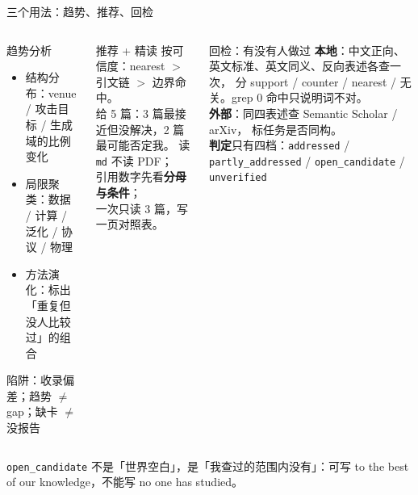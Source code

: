 \begin{frame}{三个用法：趋势、推荐、回检}
  \vspace{-3em}
  \begin{columns}[T]
    \scriptsize
    \begin{block}{趋势分析}
      \begin{itemize}
        \item 结构分布：venue / 攻击目标 / 生成域的比例变化
        \item 局限聚类：数据 / 计算 / 泛化 / 协议 / 物理
        \item 方法演化：标出「重复但没人比较过」的组合
      \end{itemize}
      \vspace{0.2em}
      \alert{陷阱}：收录偏差；趋势 $\neq$ gap；缺卡 $\neq$ 没报告
    \end{block}

    \scriptsize
    \begin{block}{推荐 + 精读}
      按可信度：nearest $>$ 引文链 $>$ 边界命中。\\
      给 5 篇：3 篇最接近但没解决，2 篇最可能否定我。
      \vspace{0.3em}
      读 \texttt{md} 不读 PDF；\\
      引用数字先看\textbf{分母与条件}；\\
      一次只读 3 篇，写一页对照表。
    \end{block}

    \scriptsize
    \begin{block}{回检：有没有人做过}
      \textbf{本地}：中文正向、英文标准、英文同义、反向表述各查一次，
      分 support / counter / nearest / 无关。\alert{grep 0 命中只说明词不对}。\\
      \textbf{外部}：同四表述查 Semantic Scholar / arXiv，
      标任务是否同构。\\
      \textbf{判定}只有四档：\texttt{addressed} /
      \texttt{partly\_addressed} / \texttt{open\_candidate} /
      \texttt{unverified}
    \end{block}
  \end{columns}

  \vspace{0.2em}
  {\scriptsize \texttt{open\_candidate} 不是「世界空白」，是「我查过的范围内没有」：可写 to the best of our knowledge，不能写 no one has studied。}
\end{frame}

